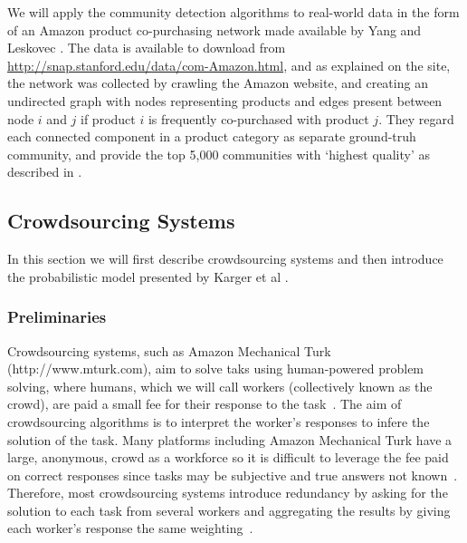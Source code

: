 \documentclass[12pt]{article}
\numberwithin{equation}{section}
\begin{document}
We will apply the community detection algorithms to real-world data in the form of an Amazon product co-purchasing network made available by Yang and Leskovec \cite{YL12}. The data is available to download from \url{http://snap.stanford.edu/data/com-Amazon.html}, and as explained on the site, the network was collected by crawling the Amazon website, and creating an undirected graph with nodes representing products and edges present between node $i$ and $j$ if product $i$ is frequently co-purchased with product $j$. They regard each connected component in a product category as separate ground-truh community, and provide the top 5,000 communities with `highest quality' as described in \cite{YL12}. 

\subsection{Crowdsourcing Systems}
\label{sec:background;subsec:crowdsourcingSystems}

In this section we will first describe crowdsourcing systems and then introduce the probabilistic model presented by Karger et al \cite{KOS13}.

\subsubsection{Preliminaries}
\label{sec:background;subsec:crowdsourcingSystems;subsubsec:preliminaries}

Crowdsourcing systems, such as Amazon Mechanical Turk (http://www.mturk.com), aim to solve taks using human-powered problem solving, where humans, which we will call workers (collectively known as the crowd), are paid a small fee for their response to the task~\cite{KOS13,EHR12}. The aim of crowdsourcing algorithms is to interpret the worker's responses to infere the solution of the task. Many platforms including Amazon Mechanical Turk have a large, anonymous, crowd as a workforce so it is difficult to leverage the fee paid on correct responses since tasks may be subjective and true answers not known~\cite{KOS13}. Therefore, most crowdsourcing systems introduce redundancy by asking for the solution to each task from several workers and aggregating the results by giving each worker's response the same weighting~\cite{KOS13}.
\end{document}
